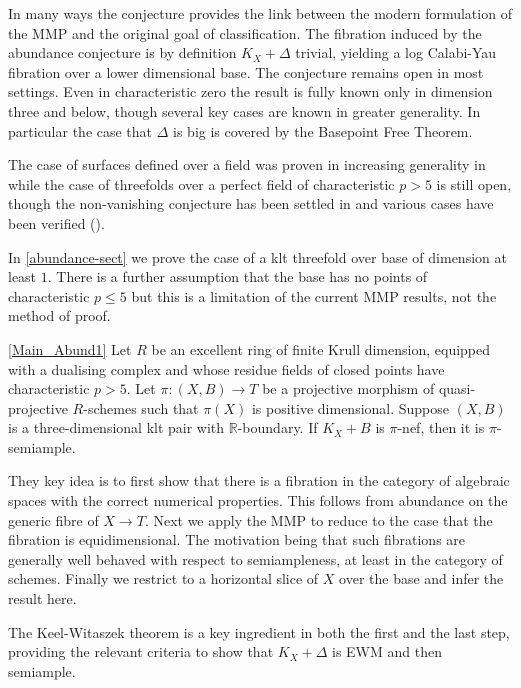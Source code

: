\documentclass[a4paper,12pt]{book}
\begin{document}
	In many ways the conjecture provides the link between the modern formulation of the MMP and the original goal of classification. The fibration induced by the abundance conjecture is by definition $K_{X}+\Delta$ trivial, yielding a log Calabi-Yau fibration over a lower dimensional base. The conjecture remains open in most settings. Even in characteristic zero the result is fully known only in dimension three and below, though several key cases are known in greater generality. In particular the case that $\Delta$ is big is covered by the Basepoint Free Theorem.

	The case of surfaces defined over a field was proven in increasing generality in \cite{fujino2012log, Tan14, tanaka2020abundance} while the case of threefolds over a perfect field of characteristic $p>5$ is still open, though the non-vanishing conjecture has been settled in \cite{XZ19, Wit} and various cases have been verified (\cite{DW19, Zha20}).
	
	In \autoref{abundance-sect} we prove the case of a klt threefold over base of dimension at least $1$. There is a further assumption that the base has no points of characteristic $p \leq 5$ but this is a limitation of the current MMP results, not the method of proof.
	
	\begin{theo}\autoref{Main_Abund1}
		Let $R$ be an excellent ring of finite Krull dimension, equipped with a dualising complex and whose residue fields of closed points have characteristic $p>5$.
		Let $\pi \colon (X,B) \to T$ be a projective morphism of quasi-projective $R$-schemes such that $\pi(X)$ is positive dimensional.
		Suppose $(X,B)$ is a three-dimensional klt pair with $\mathbb{R}$-boundary. If $K_X+B$ is $\pi$-nef, then it is $\pi$-semiample.
	\end{theo}
	
	They key idea is to first show that there is a fibration in the category of algebraic spaces with the correct numerical properties. This follows from abundance on the generic fibre of $X \to T$. Next we apply the MMP to reduce to the case that the fibration is equidimensional. The motivation being that such fibrations are generally well behaved with respect to semiampleness, at least in the category of schemes. Finally we restrict to a horizontal slice of $X$ over the base and infer the result here.
	
	The Keel-Witaszek theorem is a key ingredient in both the first and the last step, providing the relevant criteria to show that $K_{X}+\Delta$ is EWM and then semiample.
	
\end{document}

